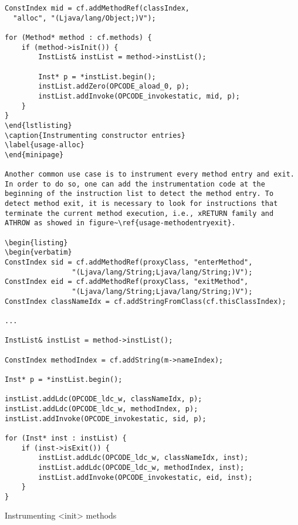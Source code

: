 \begin{listing}
\begin{verbatim}
ConstIndex mid = cf.addMethodRef(classIndex, 
  "alloc", "(Ljava/lang/Object;)V");

for (Method* method : cf.methods) {
	if (method->isInit()) {
		InstList& instList = method->instList();

		Inst* p = *instList.begin();
		instList.addZero(OPCODE_aload_0, p);
		instList.addInvoke(OPCODE_invokestatic, mid, p);
	}
}
\end{lstlisting}
\caption{Instrumenting constructor entries}
\label{usage-alloc}
\end{minipage}

Another common use case is to instrument every method entry and exit. In order to do so, one can add the instrumentation code at the beginning of the instruction list to detect the method entry. To detect method exit, it is necessary to look for instructions that terminate the current method execution, i.e., xRETURN family and ATHROW as showed in figure~\ref{usage-methodentryexit}.

\begin{listing}
\begin{verbatim}
ConstIndex sid = cf.addMethodRef(proxyClass, "enterMethod",
				"(Ljava/lang/String;Ljava/lang/String;)V");
ConstIndex eid = cf.addMethodRef(proxyClass, "exitMethod",
				"(Ljava/lang/String;Ljava/lang/String;)V");
ConstIndex classNameIdx = cf.addStringFromClass(cf.thisClassIndex);

...

InstList& instList = method->instList();

ConstIndex methodIndex = cf.addString(m->nameIndex);

Inst* p = *instList.begin();

instList.addLdc(OPCODE_ldc_w, classNameIdx, p);
instList.addLdc(OPCODE_ldc_w, methodIndex, p);
instList.addInvoke(OPCODE_invokestatic, sid, p);

for (Inst* inst : instList) {
	if (inst->isExit()) {
		instList.addLdc(OPCODE_ldc_w, classNameIdx, inst);
		instList.addLdc(OPCODE_ldc_w, methodIndex, inst);
		instList.addInvoke(OPCODE_invokestatic, eid, inst);
	}
}
\end{verbatim}
\caption{Instrumenting <init> methods}
\label{usage-methodentryexit}
\end{listing}
